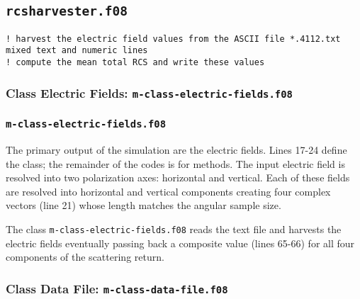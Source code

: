 % 

\subsection{\texttt{rcsharvester.f08}}
\footnotesize{
\texttt{! harvest the electric field values from the ASCII file *.4112.txt mixed text and numeric lines}\\
\texttt{! compute the mean total RCS and write these values}\\
}

\subsubsection{Class Electric Fields: \texttt{m-class-electric-fields.f08}}

\subsubsection{\texttt{m-class-electric-fields.f08}}
The primary output of the simulation are the electric fields. Lines 17-24 define the class; the remainder of the codes is for methods. The input electric field is resolved into two polarization axes: horizontal and vertical. Each of these fields are resolved into horizontal and vertical components creating four complex vectors (line 21) whose length matches the angular sample size.

The class \texttt{m-class-electric-fields.f08} reads the text file and harvests the electric fields eventually passing back a composite value (lines 65-66) for all four components of the scattering return.
		



\subsubsection{Class Data File: \texttt{m-class-data-file.f08}}
		

\endinput  %
